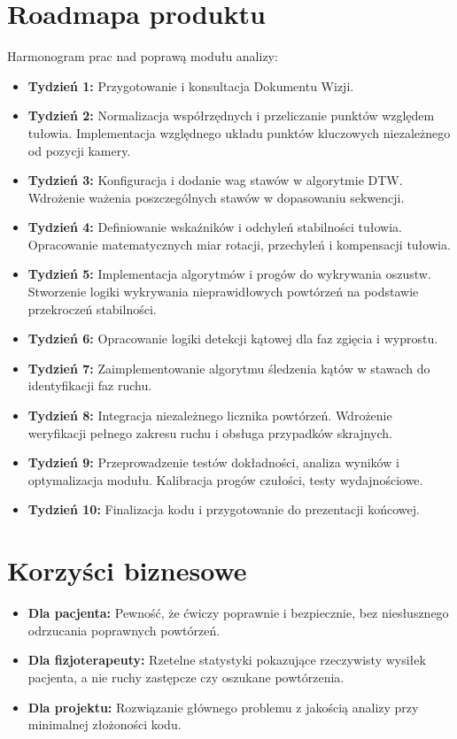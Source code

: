 \documentclass[11pt,a4paper]{article}
\begin{document}
\section{Roadmapa produktu}
Harmonogram prac nad poprawą modułu analizy:
\begin{itemize}
    \item \textbf{Tydzień 1:} Przygotowanie i konsultacja Dokumentu Wizji.
    \item \textbf{Tydzień 2:} Normalizacja współrzędnych i przeliczanie punktów względem tułowia. Implementacja względnego układu punktów kluczowych niezależnego od pozycji kamery.
    \item \textbf{Tydzień 3:} Konfiguracja i dodanie wag stawów w algorytmie DTW. Wdrożenie ważenia poszczególnych stawów w dopasowaniu sekwencji.
    \item \textbf{Tydzień 4:} Definiowanie wskaźników i odchyleń stabilności tułowia. Opracowanie matematycznych miar rotacji, przechyleń i kompensacji tułowia.
    \item \textbf{Tydzień 5:} Implementacja algorytmów i progów do wykrywania oszustw. Stworzenie logiki wykrywania nieprawidłowych powtórzeń na podstawie przekroczeń stabilności.
    \item \textbf{Tydzień 6:} Opracowanie logiki detekcji kątowej dla faz zgięcia i wyprostu. 
    \item \textbf{Tydzień 7:} Zaimplementowanie algorytmu śledzenia kątów w stawach do identyfikacji faz ruchu.
    \item \textbf{Tydzień 8:} Integracja niezależnego licznika powtórzeń. Wdrożenie weryfikacji pełnego zakresu ruchu i obsługa przypadków skrajnych.
    \item \textbf{Tydzień 9:} Przeprowadzenie testów dokładności, analiza wyników i optymalizacja modułu. Kalibracja progów czułości, testy wydajnościowe.
    \item \textbf{Tydzień 10:} Finalizacja kodu i przygotowanie do prezentacji końcowej.
\end{itemize}

\section{Korzyści biznesowe}
\begin{itemize}
    \item \textbf{Dla pacjenta:} Pewność, że ćwiczy poprawnie i bezpiecznie, bez niesłusznego odrzucania poprawnych powtórzeń.
    \item \textbf{Dla fizjoterapeuty:} Rzetelne statystyki pokazujące rzeczywisty wysiłek pacjenta, a nie ruchy zastępcze czy oszukane powtórzenia.
    \item \textbf{Dla projektu:} Rozwiązanie głównego problemu z jakością analizy przy minimalnej złożoności kodu.
\end{itemize}
\end{document}
